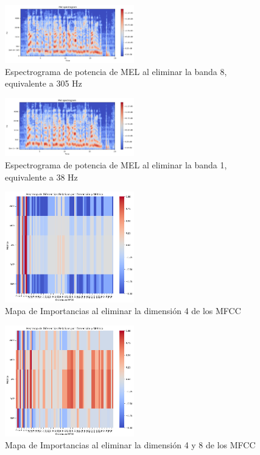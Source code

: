 \documentclass[conference]{IEEEtran}
\begin{document}
\begin{figure}[ht]
\centering
\includegraphics[width=0.5\textwidth]{images/dim_8_erasured.png}
\caption{Espectrograma de potencia de MEL al eliminar la banda 8, equivalente a 305 Hz}
\end{figure}

\begin{figure}[ht]
\centering
\includegraphics[width=0.5\textwidth]{images/dim_1_erasured.png}
\caption{Espectrograma de potencia de MEL al eliminar la banda 1, equivalente a 38 Hz}
\end{figure}

\begin{figure}[ht]
\centering
\includegraphics[width=0.5\textwidth]{images/importance_plot_no_dims_4.png}
\caption{Mapa de Importancias al eliminar la dimensión 4 de los MFCC}
\end{figure}

\begin{figure}[ht]
\centering
\includegraphics[width=0.5\textwidth]{images/importance_plot_no_dims_4-8.png}
\caption{Mapa de Importancias al eliminar la dimensión 4 y 8 de los MFCC}
\end{figure}
\end{document}
